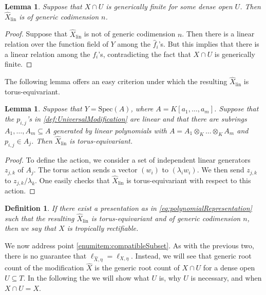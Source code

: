 \documentclass[12pt,reqno,a4paper]{amsart}
\theoremstyle{theoremstyle}
\newtheorem{lemma}[theorem]{Lemma}
\theoremstyle{examplestyle}
\newtheorem{definition}[theorem]{Definition}
\theoremstyle{algorithmstyle}
\begin{document}
\begin{lemma}\label{lem:GenFiniteImpliesGenCI}
  Suppose that $X\cap U$ is generically finite for some dense open $U$.  Then $\widehat{X}_{\mathrm{lin}}$ is of generic codimension $n$.
\end{lemma}
\begin{proof}
  Suppose that $\widehat{X}_{\mathrm{lin}}$ is not of generic codimension $n$. Then there is a linear relation over the function field of $Y$ among the $\hat{f}_{i}$'s. But this implies that there is a linear relation among the $f_{i}$'s, contradicting the fact that $X\cap U$ is generically finite.
\end{proof}

The following lemma offers an easy criterion under which the resulting $\widehat{X}_{\mathrm{lin}}$ is torus-equivariant.

\begin{lemma}\label{lem:TorusEquivariantModifications}
  Suppose that $Y=\mathrm{Spec}(A)$, where $A=K[a_{1},\dots,a_{m}]$. Suppose that the $p_{i,j}$'s in \cref{def:UniversalModification} are linear and that there are subrings $A_{1},\dots,A_m\subseteq{A}$ generated by linear polynomials with $A=A_{1}\otimes_K\dots\otimes_KA_m$ and $p_{i,j}\in{A_{j}}$.  Then $\widehat{X}_{\mathrm{lin}}$ is torus-equivariant.
\end{lemma}
\begin{proof}
  To define the action, we consider a set of independent linear generators $z_{j,k}$ of $A_{j}$.
  The torus action sends a vector $(w_{i})$ to $(\lambda_{i}w_{i})$. We then send $z_{j,k}$ to $z_{j,k}/\lambda_{k}$. One easily checks that $\widehat{X}_{\mathrm{lin}}$ is torus-equivariant with respect to this action.
\end{proof}

\begin{definition}\label{rem:TropicallyModifiable}
  If there exist a presentation as in \cref{eq:polynomialRepresentation} such that the resulting $\widehat{X}_{\mathrm{lin}}$ is torus-equivariant and of generic codimension $n$, then we say that $X$ is \emph{tropically rectifiable}.   %
\end{definition}

We now address point \ref{enumitem:compatibleSubset}.
As with the previous two, there is no guarantee that $\ell_{\widehat{X},\eta}=\ell_{X,\eta}$.
Instead, we will see that generic root count of the modification $\widehat X$ is the generic root count of $X\cap U$ for a dense open $U\subseteq T$. In the following the we will show what $U$ is, why $U$ is necessary, and when $X\cap U=X$.
\end{document}
